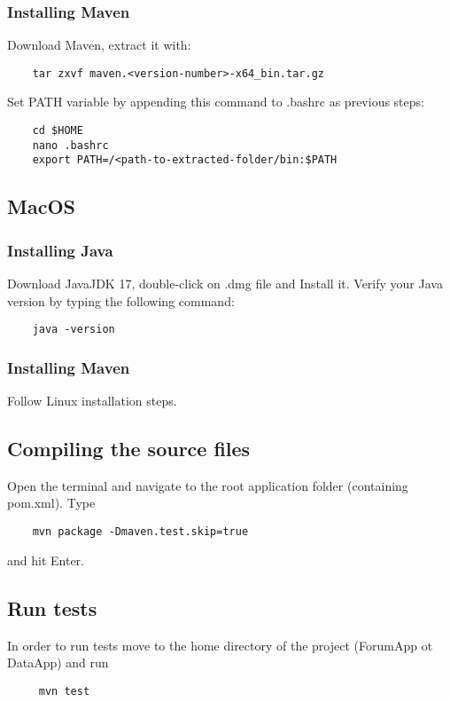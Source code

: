 \subsubsection{Installing Maven}
Download Maven, extract it with:
\begin{verbatim}
    tar zxvf maven.<version-number>-x64_bin.tar.gz
\end{verbatim}
Set PATH variable by appending this command to .bashrc as previous steps:
\begin{verbatim}
    cd $HOME
    nano .bashrc
    export PATH=/<path-to-extracted-folder/bin:$PATH
\end{verbatim}

\subsection{MacOS}

\subsubsection{Installing Java}
Download JavaJDK 17, double-click on .dmg file and Install it. Verify your Java version by typing the following command:
\begin{verbatim}
    java -version
\end{verbatim}

\subsubsection{Installing Maven}
Follow Linux installation steps.

\subsection{Compiling the source files}
Open the terminal and navigate to the root application folder (containing pom.xml).
Type 
\begin{verbatim}
    mvn package -Dmaven.test.skip=true
\end{verbatim}
 and hit Enter.
 
 \subsection{Run tests}
 In order to run tests move to the home directory of the project (ForumApp ot DataApp) and run
 \begin{verbatim}
     mvn test
 \end{verbatim}